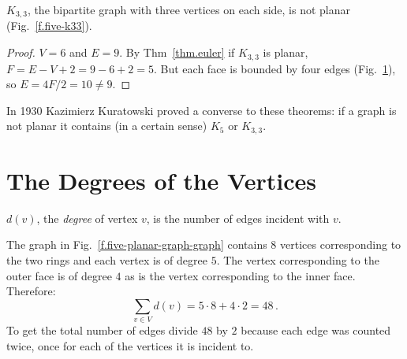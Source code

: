 \begin{theorem}
$K_{3,3}$, the bipartite graph with three vertices on each side, is not planar (Fig.~\ref{f.five-k33}).
\end{theorem}

\begin{figure}[b]
\subfigures
{}
\hfill
{}
\label{f.five-k33}
\label{f.five-k33-failed}
\end{figure}

\begin{proof}
$V=6$ and $E=9$. By Thm~\ref{thm.euler} if $K_{3,3}$ is planar, $F=E-V+2=9-6+2=5$. But each face is bounded by four edges (Fig.~\ref{f.five-k33-failed}), so $E=4F/2=10\neq 9$.
\end{proof}

In 1930 Kazimierz Kuratowski proved a converse to these theorems: if a graph is not planar it contains (in a certain sense) $K_5$ or $K_{3,3}$.

\section{The Degrees of the Vertices}\label{s.degrees}

\begin{definition}
$d(v)$, the \emph{degree} of vertex $v$, is the number of edges incident with $v$.
\end{definition}

\begin{example}
The graph in Fig.~\ref{f.five-planar-graph-graph} contains $8$ vertices corresponding to the two rings and each vertex is of degree $5$. The vertex corresponding to the outer face is of degree $4$ as is the vertex corresponding to the inner face. Therefore:
\[
\sum_{v\in V} d(v) = 5\cdot 8 + 4\cdot 2=48\,.
\]
To get the total number of edges divide $48$ by $2$ because  each edge was counted twice, once for each of the vertices it is incident to.
\end{example}

